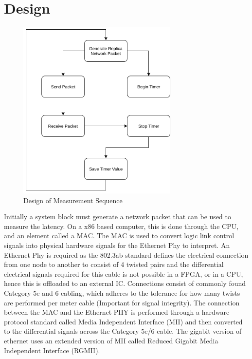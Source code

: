\chapter{Design}\label{C:design}

\begin{figure}[H]
    \begin{center}
        \includegraphics[keepaspectratio,width=8cm]{Images/MeasurementSequence}
        \caption{Design of Measurement Sequence}
        \label{fig:measurementsequence}
    \end{center}
\end{figure}

\par Initially a system block must generate a network packet that can be used to measure the latency. On a x86 based 
computer, this is done through the CPU, and an element called a MAC. The MAC is used to convert logic link control 
signals into physical hardware signals for the Ethernet Phy to interpret. An Ethernet Phy is required as the 802.3ab 
standard defines the electrical connection from one node to another to consist of 4 twisted pairs and the 
differential electrical signals required for this cable is not possible in a FPGA, or in a CPU, hence this is 
offloaded to an external IC. Connections consist of commonly found Category 5e and 6 cabling, which adheres to the 
tolerance for how many twists are performed per meter cable (Important for signal integrity). The connection between 
the MAC and the Ethernet PHY is performed through a hardware protocol standard called Media Independent Interface 
(MII) and then converted to the differential signals across the Category 5e/6 cable. The gigabit version of ethernet 
uses an extended version of MII called Reduced Gigabit Media Independent Interface (RGMII).

